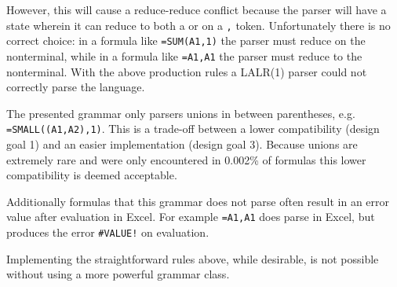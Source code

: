 However, this will cause a reduce-reduce conflict because the parser will have a state wherein it can reduce to both a  or  on a \texttt{,} token.
Unfortunately there is no correct choice: in a formula like \texttt{=SUM(A1,1)} the parser must reduce on the  nonterminal, while in a formula like \texttt{=A1,A1} the parser must reduce to the  nonterminal.
With the above production rules a LALR(1) parser could not correctly parse the language.

The presented grammar only parsers unions in between parentheses, e.g. \texttt{=SMALL((A1,A2),1)}.
This is a trade-off between a lower compatibility (design goal 1) and an easier implementation (design goal 3).
Because unions are extremely rare and were only encountered in 0.002\% of formulas \cite{xlparser} this lower compatibility is deemed acceptable.

Additionally formulas that this grammar does not parse often result in an error value after evaluation in Excel.
For example \texttt{=A1,A1} does parse in Excel, but produces the error \texttt{\#VALUE!} on evaluation.

Implementing the straightforward rules above, while desirable, is not possible without using a more powerful grammar class.